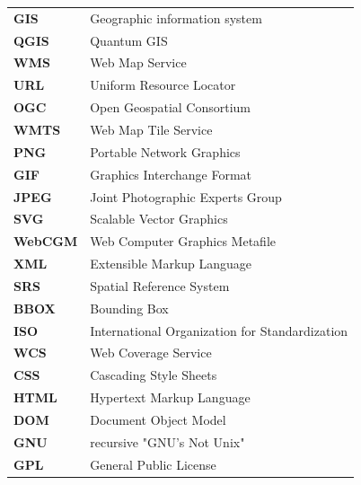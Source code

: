 \documentclass[12pt,a4paper]{article}
\begin{document}
\begin{tabular}{ll}
\textbf{GIS}& Geographic information system\\
\textbf{QGIS}& Quantum GIS\\
\textbf{WMS}& Web Map Service\\
\textbf{URL}& Uniform Resource Locator\\
\textbf{OGC}& Open Geospatial Consortium\\
\textbf{WMTS}& Web Map Tile Service\\
\textbf{PNG}& Portable Network Graphics\\
\textbf{GIF}& Graphics Interchange Format\\
\textbf{JPEG}& Joint Photographic Experts Group\\
\textbf{SVG}& Scalable Vector Graphics\\
\textbf{WebCGM}& Web Computer Graphics Metafile\\
\textbf{XML}& Extensible Markup Language\\
\textbf{SRS}& Spatial Reference System\\
\textbf{BBOX}& Bounding Box \\
\textbf{ISO}& International Organization for Standardization \\
\textbf{WCS}& Web Coverage Service\\
\textbf{CSS}& Cascading Style Sheets\\
\textbf{HTML}& Hypertext Markup Language\\
\textbf{DOM}&  Document Object Model\\
\textbf{GNU}& recursive "GNU's Not Unix"\\
\textbf{GPL}& General Public License\\
\end{tabular}
\end{document}

